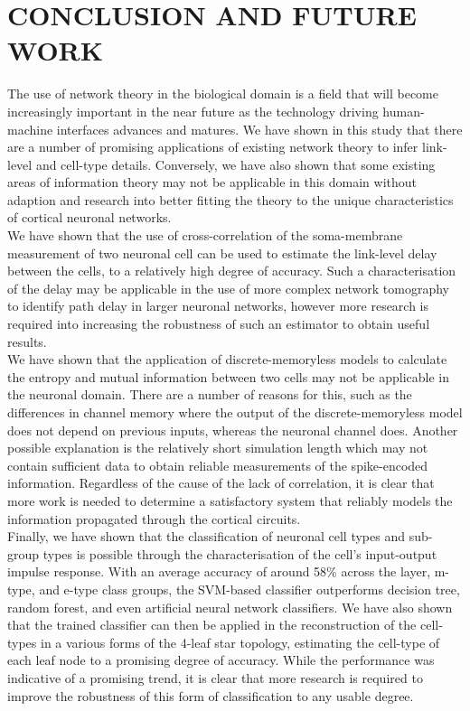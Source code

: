 \documentclass[letterpaper, 10 pt, conference]{ieeeconf}  %
\begin{document}
\section{CONCLUSION AND FUTURE WORK}

The use of network theory in the biological domain is a field that will become increasingly important in the near future as the technology driving human-machine interfaces advances and matures. We have shown in this study that there are a number of promising applications of existing network theory to infer link-level and cell-type details. Conversely, we have also shown that some existing areas of information theory may not be applicable in this domain without adaption and research into better fitting the theory to the unique characteristics of cortical neuronal networks.\\
We have shown that the use of cross-correlation of the soma-membrane measurement of two neuronal cell can be used to estimate the link-level delay between the cells, to a relatively high degree of accuracy. Such a characterisation of the delay may be applicable in the use of more complex network tomography to identify path delay in larger neuronal networks, however more research is required into increasing the robustness of such an estimator to obtain useful results.\\
We have shown that the application of discrete-memoryless models to calculate the entropy and mutual information between two cells may not be applicable in the neuronal domain. There are a number of reasons for this, such as the differences in channel memory where the output of the discrete-memoryless model does not depend on previous inputs, whereas the neuronal channel does. Another possible explanation is the relatively short simulation length which may not contain sufficient data to obtain reliable measurements of the spike-encoded information. Regardless of the cause of the lack of correlation, it is clear that more work is needed to determine a satisfactory system that reliably models the information propagated through the cortical circuits.\\
Finally, we have shown that the classification of neuronal cell types and sub-group types is possible through the characterisation of the cell's input-output impulse response. With an average accuracy of around 58\% across the layer, m-type, and e-type class groups, the SVM-based classifier outperforms decision tree, random forest, and even artificial neural network classifiers. We have also shown that the trained classifier can then be applied in the reconstruction of the cell-types in a various forms of the 4-leaf star topology, estimating the cell-type of each leaf node to a promising degree of accuracy. While the performance was indicative of a promising trend, it is clear that more research is required to improve the robustness of this form of classification to any usable degree.\\
\end{document}
